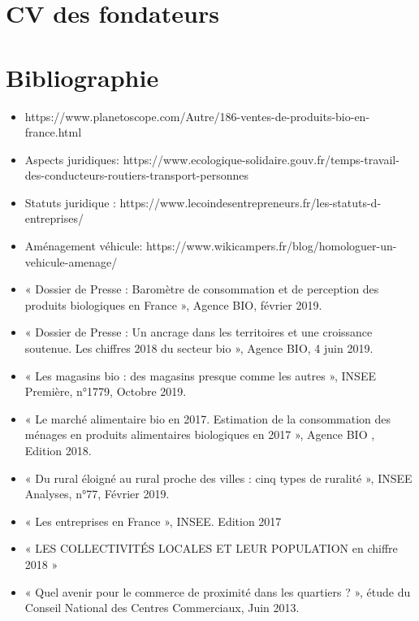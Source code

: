 \documentclass[12pt,a4paper]{report}
\begin{document}
\begin{appendix}
	\chapter{CV des fondateurs}

	
	
	
	
	


	\chapter{Bibliographie}
	
	\begin{itemize}
		\item  https://www.planetoscope.com/Autre/186-ventes-de-produits-bio-en-france.html
		\item Aspects juridiques: https://www.ecologique-solidaire.gouv.fr/temps-travail-des-conducteurs-routiers-transport-personnes
		\item Statuts juridique : https://www.lecoindesentrepreneurs.fr/les-statuts-d-entreprises/
		\item Aménagement véhicule: https://www.wikicampers.fr/blog/homologuer-un-vehicule-amenage/
		
		\item « Dossier de Presse : Baromètre de consommation et de perception des produits biologiques en France », Agence BIO, février 2019.
		
		
		\item « Dossier de Presse : Un ancrage dans les territoires et une croissance soutenue. Les chiffres 2018 du secteur bio », Agence BIO, 4 juin 2019.
		
		\item « Les magasins bio : des magasins presque comme les autres », INSEE Première, n°1779, Octobre 2019.
		
		\item « Le marché alimentaire bio en 2017.  Estimation de la consommation des ménages en produits alimentaires biologiques en 2017 », Agence BIO , Edition 2018.
		
		
		\item « Du rural éloigné au rural proche des villes : cinq types de ruralité », INSEE Analyses, n°77, Février 2019.
		
		\item « Les entreprises en France », INSEE. Edition 2017
		
		\item « LES COLLECTIVITÉS LOCALES ET LEUR POPULATION en chiffre 2018 »
		
		\item « Quel avenir pour le commerce de proximité dans les quartiers ? », étude du Conseil National des Centres Commerciaux, Juin 2013.
		
	\end{itemize}

\end{appendix}
\end{document}
